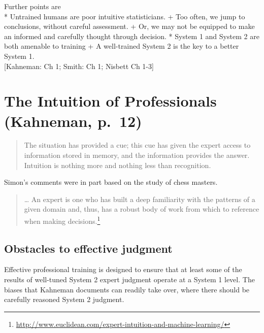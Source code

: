 \documentclass[
  10pt,
  b5paper]{book}
\begin{document}
Further points are\\
* Untrained humans are poor intuitive statisticians.
+ Too often, we jump to conclusions, without careful assessment.
+ Or, we may not be equipped to make an informed and carefully
thought through decision.
* System 1 and System 2 are both amenable to training
+ A well-trained System 2 is the key to a better System 1.\\
{[}Kahneman: Ch 1; Smith: Ch 1; Nisbett Ch 1-3{]}

\hypertarget{the-intuition-of-professionals-kahneman-p.-12}{%
\section{The Intuition of Professionals (Kahneman, p.~12)}\label{the-intuition-of-professionals-kahneman-p.-12}}

\begin{quote}
The situation has provided a cue; this cue has given the expert access to information stored in memory, and the information provides the answer. Intuition is nothing more and nothing less than recognition.\\
\citep[``What is an Explanation of Behavior?'']{simon1992explanation}
\end{quote}

Simon's comments were in part based on the study of chess masters.

\begin{quote}
\ldots{} An expert is one who has built a deep familiarity with the patterns of a given domain and, thus, has a robust body of work from which to reference when making decisions.\footnote{
  \url{http://www.euclidean.com/expert-intuition-and-machine-learning/}}
\end{quote}

\hypertarget{obstacles-to-effective-judgment}{%
\subsection*{Obstacles to effective judgment}\label{obstacles-to-effective-judgment}}

Effective professional training is designed to ensure that at least
some of the results of well-tuned System 2 expert judgment operate
at a System 1 level. The biases that Kahneman documents can readily
take over, where there should be carefully reasoned System 2 judgment.
\end{document}
